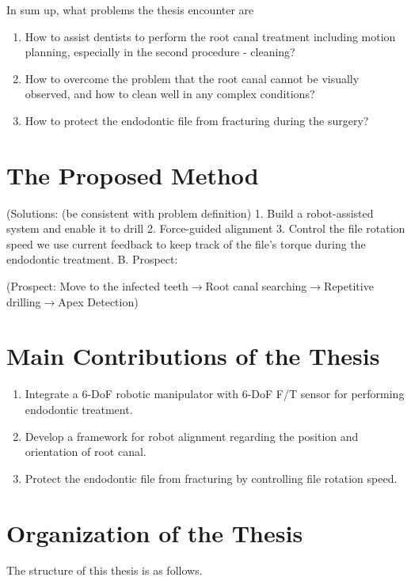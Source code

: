 \par\noindent
In sum up, what problems the thesis encounter are 
\begin{enumerate}
\item How to assist dentists to perform the root canal treatment including motion planning, especially in the second procedure - cleaning?
\item How to overcome the problem that the root canal cannot be visually observed, and how to clean well in any complex conditions?
\item How to protect the endodontic file from fracturing during the surgery?
\end{enumerate}	
\section{The Proposed Method}
(Solutions: (be consistent with problem definition)
1.	Build a robot-assisted system and enable it to drill
2.	Force-guided alignment 
3.	Control the file rotation speed
we use current feedback to keep track of the file's torque during the endodontic treatment.
B.	Prospect:
\par\noindent
(Prospect: Move to the infected teeth$\longrightarrow $Root canal searching$\longrightarrow $Repetitive drilling$\longrightarrow $Apex Detection)						
\section{Main Contributions of the Thesis}
\begin{enumerate}
	\item	Integrate a 6-DoF robotic manipulator with 6-DoF F/T sensor for performing endodontic treatment.
	\item	Develop a framework for robot alignment regarding the position and orientation of root canal. 
	\item	Protect the endodontic file from fracturing by controlling file rotation speed.
\end{enumerate}
\section{Organization of the Thesis}
\hspace*{6mm}The structure of this thesis is as follows.